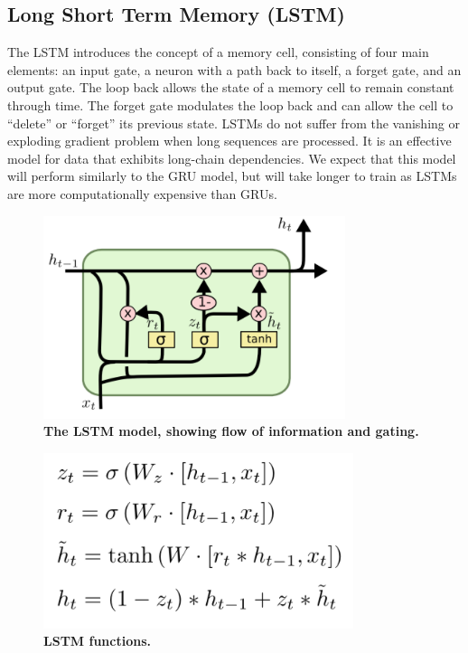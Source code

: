 \documentclass[11pt,a4paper]{article}
\begin{document}
	
	\subsection{Long Short Term Memory (LSTM)}
	
	The LSTM introduces the concept of a memory cell, consisting of four main elements: an input gate, a neuron with a path back to itself, a forget gate, and an output gate. The loop back allows the state of a memory cell to remain constant through time. The forget gate modulates the loop back and can allow the cell to “delete” or “forget” its previous state. LSTMs do not suffer from the vanishing or exploding gradient problem when long sequences are processed. It is an effective model for data that exhibits long-chain dependencies. We expect that this model will perform similarly to the GRU model, but will take longer to train as LSTMs are more computationally expensive than GRUs.  
	 \begin{figure}[H]
	 	\hspace*{-1.3cm}
	 	\centering\includegraphics[scale=0.7]{lstm_image} 
	 	\caption{\textbf{ The LSTM model, showing flow of information and gating.}}
	 \end{figure}
	
	\begin{figure}[H]
		\hspace*{-1.3cm}
		\centering\includegraphics[scale=0.5]{lstm_functions} 
		\caption{\textbf{ LSTM functions.}}
	\end{figure}
\end{document}
